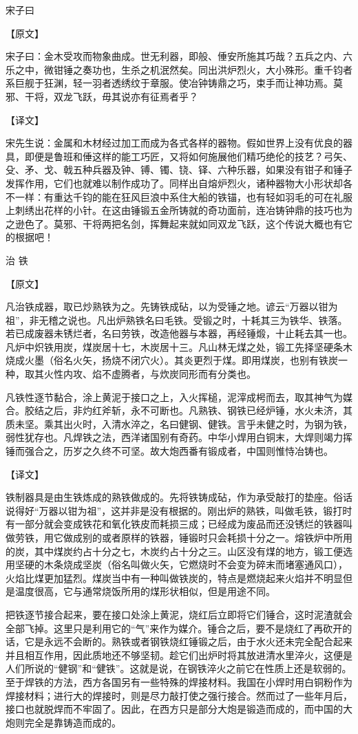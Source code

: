 \documentclass[12pt,UTF8]{ctexbook}
\begin{document}
宋子曰

【原文】

宋子曰：金木受攻而物象曲成。世无利器，即般、倕安所施其巧哉？五兵之内、六乐之中，微钳锤之奏功也，生杀之机泯然矣。同出洪炉烈火，大小殊形。重千钧者系巨舰于狂渊，轻一羽者透绣纹于章服。使冶钟铸鼎之巧，束手而让神功焉。莫邪、干将，双龙飞跃，毋其说亦有征焉者乎？

【译文】

宋先生说：金属和木材经过加工而成为各式各样的器物。假如世界上没有优良的器具，即便是鲁班和倕这样的能工巧匠，又将如何施展他们精巧绝伦的技艺？弓矢、殳、矛、戈、戟五种兵器及钟、镈、镯、铙、铎、六种乐器，如果没有钳子和锤子发挥作用，它们也就难以制作成功了。同样出自熔炉烈火，诸种器物大小形状却各不一样：有重达千钧的能在狂风巨浪中系住大船的铁锚，也有轻如羽毛的可在礼服上刺绣出花样的小针。在这由锤锻五金所铸就的奇功面前，连冶铸钟鼎的技巧也为之逊色了。莫邪、干将两把名剑，挥舞起来就如同双龙飞跃，这个传说大概也有它的根据吧！

治 铁

【原文】

凡治铁成器，取已炒熟铁为之。先铸铁成砧，以为受锤之地。谚云“万器以钳为祖”，非无稽之说也。凡出炉熟铁名曰毛铁。受锻之时，十耗其三为铁华、铁落。若已成废器未锈烂者，名曰劳铁，改造他器与本器，再经锤煅，十止耗去其一也。凡炉中炽铁用炭，煤炭居十七，木炭居十三。凡山林无煤之处，锻工先择坚硬条木烧成火墨（俗名火矢，扬烧不闭穴火）。其炎更烈于煤。即用煤炭，也别有铁炭一种，取其火性内攻、焰不虚腾者，与炊炭同形而有分类也。

凡铁性逐节黏合，涂上黄泥于接口之上，入火挥槌，泥滓成枵而去，取其神气为媒合。胶结之后，非灼红斧斩，永不可断也。凡熟铁、钢铁已经炉锤，水火未济，其质未坚。乘其出火时，入清水淬之，名曰健钢、健铁。言乎未健之时，为钢为铁，弱性犹存也。凡焊铁之法，西洋诸国别有奇药。中华小焊用白铜末，大焊则竭力挥锤而强合之，历岁之久终不可坚。故大炮西番有锻成者，中国则惟恃冶铸也。

【译文】

铁制器具是由生铁炼成的熟铁做成的。先将铁铸成砧，作为承受敲打的垫座。俗话说得好“万器以钳为祖”，这并非是没有根据的。刚出炉的熟铁，叫做毛铁，锻打时有一部分就会变成铁花和氧化铁皮而耗损三成；已经成为废品而还没锈烂的铁器叫做劳铁，用它做成别的或者原样的铁器，锤锻时只会耗损十分之一。熔铁炉中所用的炭，其中煤炭约占十分之七，木炭约占十分之三。山区没有煤的地方，锻工便选用坚硬的木条烧成坚炭（俗名叫做火矢，它燃烧时不会变为碎末而堵塞通风口），火焰比煤更加猛烈。煤炭当中有一种叫做铁炭的，特点是燃烧起来火焰并不明显但是温度很高，它与通常烧饭所用的煤形状相似，但是用途不同。

把铁逐节接合起来，要在接口处涂上黄泥，烧红后立即将它们锤合，这时泥渣就会全部飞掉。这里只是利用它的“气”来作为媒介。锤合之后，要不是烧红了再砍开的话，它是永远不会断的。熟铁或者钢铁烧红锤锻之后，由于水火还未完全配合起来并且相互作用，因此质地还不够坚韧。趁它们出炉时将其放进清水里淬火，这便是人们所说的“健钢”和“健铁”。这就是说，在钢铁淬火之前它在性质上还是软弱的。至于焊铁的方法，西方各国另有一些特殊的焊接材料。我国在小焊时用白铜粉作为焊接材料；进行大的焊接时，则是尽力敲打使之强行接合。然而过了一些年月后，接口也就脱焊而不牢固了。因此，在西方只是部分大炮是锻造而成的，而中国的大炮则完全是靠铸造而成的。
\end{document}
